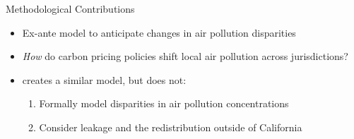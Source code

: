 \documentclass[11pt, aspectratio = 169]{beamer}
\begin{document}
\begin{frame}{Methodological Contributions}
    
\begin{itemize}
    \item Ex-ante model to anticipate changes in air pollution disparities
    \vfill 
    \item \emph{How} do carbon pricing policies shift local air pollution across jurisdictions?
    \vfill
    \item \cite{weber2021dynamic} creates a similar model, but does not:
    \begin{enumerate}
        \item Formally model disparities in air pollution concentrations
        \item Consider leakage and the redistribution outside of California
    \end{enumerate}
\end{itemize}

\end{frame}

    



\end{document}
